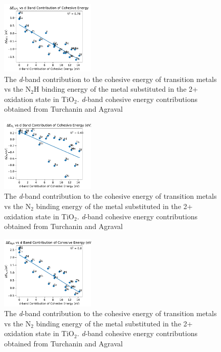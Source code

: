 \begin{figure}
    \centering
    \includegraphics[width=0.4\textwidth]{Images/cohesive_eng_vs_N2H.pdf}
    
    \caption{The \textit{d}-band contribution to the cohesive energy of transition metals vs the N$_2$H binding energy of the metal substituted in the 2+ oxidation state in TiO$_2$. \textit{d}-band cohesive energy contributions obtained from Turchanin and Agraval\cite{Turchanin_2008}}
    \label{fig:N2H_cohesive}
\end{figure}

\begin{figure}
    \centering
    \includegraphics[width=0.4\textwidth]{Images/cohesive_eng_vs_N2.pdf}
    
    \caption{The \textit{d}-band contribution to the cohesive energy of transition metals vs the N$_2$ binding energy of the metal substituted in the 2+ oxidation state in TiO$_2$. \textit{d}-band cohesive energy contributions obtained from Turchanin and Agraval\cite{Turchanin_2008}}
    \label{fig:N2_cohesive}
\end{figure}

\begin{figure}
    \centering
    \includegraphics[width=0.4\textwidth]{Images/cohesive_eng_vs_NH2.pdf}
    
    \caption{The \textit{d}-band contribution to the cohesive energy of transition metals vs the N$_2$ binding energy of the metal substituted in the 2+ oxidation state in TiO$_2$. \textit{d}-band cohesive energy contributions obtained from Turchanin and Agraval\cite{Turchanin_2008}}
    \label{fig:N2_cohesive}
\end{figure}


